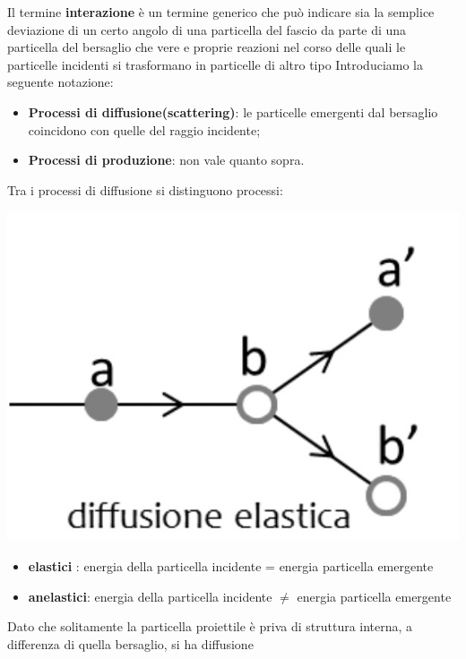 Il termine \textbf{interazione} è un termine generico che può indicare sia la semplice deviazione di un certo angolo
di una particella del fascio da parte di una particella del bersaglio che vere e proprie reazioni nel corso delle quali
le particelle incidenti si trasformano in particelle di altro tipo
Introduciamo la seguente notazione:
\begin{itemize}
	\tightlist
	\item
	\textbf{Processi di diffusione(scattering)}: le particelle emergenti dal bersaglio
	coincidono con quelle del raggio incidente;
	\item
	\textbf{Processi di produzione}: non vale quanto sopra.
\end{itemize}
Tra i processi di diffusione si distinguono processi:
\begin{marginfigure}
	\includegraphics{figs/diffusione-elastica}
	\label{fig:diffusione-elastica}
\end{marginfigure}
\begin{itemize}
	\tightlist
	\item
	\textbf{elastici} : energia della particella incidente = energia particella emergente
	\item
	\textbf{anelastici}: energia della particella incidente \(\neq\) energia particella emergente
\end{itemize}
Dato che solitamente la particella proiettile è priva di struttura
interna, a differenza di quella bersaglio, si ha diffusione
